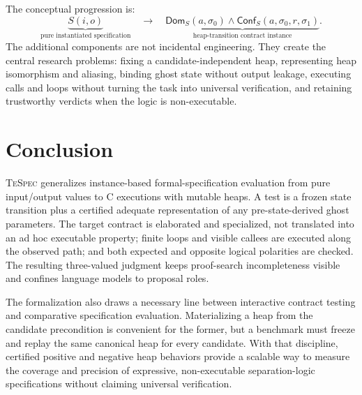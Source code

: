 \documentclass[10pt]{article}
\newcommand{\tespec}{\textsc{TeSpec}}
\begin{document}
The conceptual progression is:
\[
\underbrace{S(i,o)}_{\text{pure instantiated specification}}
\quad\longrightarrow\quad
\underbrace{\mathsf{Dom}_S(a,\sigma_0)\land
  \mathsf{Conf}_S(a,\sigma_0,r,\sigma_1)}_
 {\text{heap-transition contract instance}}.
\]
The additional components are not incidental engineering.  They create the
central research problems: fixing a candidate-independent heap, representing
heap isomorphism and aliasing, binding ghost state without output leakage,
executing calls and loops without turning the task into universal
verification, and retaining trustworthy verdicts when the logic is
non-executable.

\section{Conclusion}

\tespec{} generalizes instance-based formal-specification evaluation from pure
input/output values to C executions with mutable heaps.  A test is a frozen
state transition plus a certified adequate representation of any
pre-state-derived ghost parameters.  The target contract is elaborated and
specialized, not translated into an ad hoc executable property; finite loops
and visible callees are executed along the observed path; and both expected
and opposite logical polarities are checked.  The resulting three-valued
judgment keeps proof-search incompleteness visible and confines language
models to proposal roles.

The formalization also draws a necessary line between interactive contract
testing and comparative specification evaluation.  Materializing a heap from
the candidate precondition is convenient for the former, but a benchmark must
freeze and replay the same canonical heap for every candidate.  With that
discipline, certified positive and negative heap behaviors provide a scalable
way to measure the coverage and precision of expressive, non-executable
separation-logic specifications without claiming universal verification.



\end{document}

